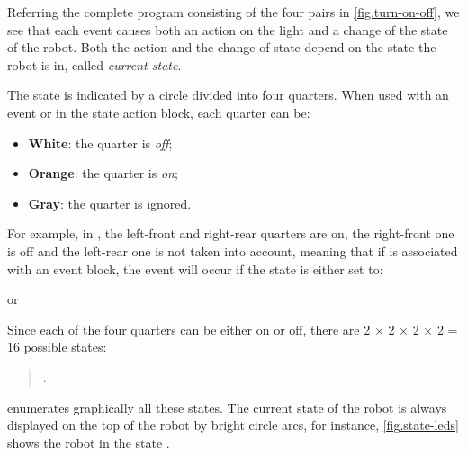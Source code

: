 Referring the complete program consisting of the four pairs in \cref{fig.turn-on-off}, we see that
each event causes both an action on the light and a change of the state
of the robot. Both the action and the change of state depend on the state the robot is in, called \emph{current state}.

\newpage


The state is indicated by a circle divided into four quarters.
When used with an event or in the state action block, each quarter can be:
\begin{itemize}
\item \textbf{White}: the quarter is \emph{off};
\item \textbf{Orange}: the quarter is \emph{on};
\item \textbf{Gray}: the quarter is ignored.
\end{itemize}

For example, in , the left-front and right-rear quarters are on, the
right-front one is off and the left-rear one is not taken into account,
meaning that if  is associated with an event block, the
event will occur if the state is either set to:
\begin{center}
\centering {}\quad or \quad {}
\end{center}

Since each of the four quarters can be either on or off, there are 2 $\times$ 2 $\times$ 2 $\times$ 2 = 16 possible states:
\begin{quote}
.
\end{quote}
 enumerates graphically all these states.
The current state of the robot is always displayed on the top of the robot by bright circle arcs, for instance, \cref{fig.state-leds} shows the robot in the state .


